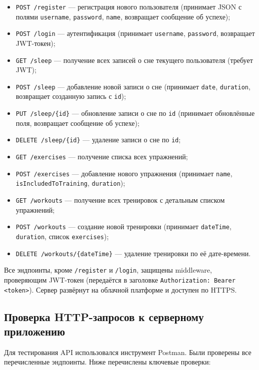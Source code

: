 \begin{itemize}
    \item \texttt{POST /register} — регистрация нового пользователя (принимает JSON с полями \texttt{username}, \texttt{password}, \texttt{name}, возвращает сообщение об успехе);
    \item \texttt{POST /login} — аутентификация (принимает \texttt{username}, \texttt{password}, возвращает JWT-токен);
    \item \texttt{GET /sleep} — получение всех записей о сне текущего пользователя (требует JWT);
    \item \texttt{POST /sleep} — добавление новой записи о сне (принимает \texttt{date}, \texttt{duration}, возвращает созданную запись с \texttt{id});
    \item \texttt{PUT /sleep/\{id\}} — обновление записи о сне по \texttt{id} (принимает обновлённые поля, возвращает сообщение об успехе);
    \item \texttt{DELETE /sleep/\{id\}} — удаление записи о сне по \texttt{id};
    \item \texttt{GET /exercises} — получение списка всех упражнений;
    \item \texttt{POST /exercises} — добавление нового упражнения (принимает \texttt{name}, \texttt{isIncludedToTraining}, \texttt{duration});
    \item \texttt{GET /workouts} — получение всех тренировок с детальным списком упражнений;
    \item \texttt{POST /workouts} — создание новой тренировки (принимает \texttt{dateTime}, \texttt{duration}, список \texttt{exercises});
    \item \texttt{DELETE /workouts/\{dateTime\}} — удаление тренировки по её дате-времени.
\end{itemize}

Все эндпоинты, кроме \texttt{/register} и \texttt{/login}, защищены middleware, проверяющим JWT-токен (передаётся в заголовке \texttt{Authorization: Bearer <token>}). Сервер развёрнут на облачной платформе и доступен по HTTPS.

\subsection{Проверка HTTP-запросов к серверному приложению}

Для тестирования API использовался инструмент Postman. Были проверены все перечисленные эндпоинты. Ниже перечислены ключевые проверки:

